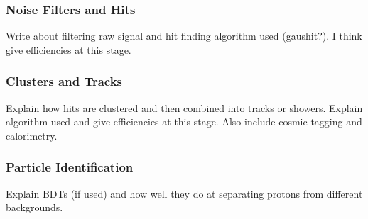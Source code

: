   \subsubsection{Noise Filters and Hits}
    Write about filtering raw signal and hit finding algorithm used (gaushit?).
    I think give efficiencies at this stage.
  \subsubsection{Clusters and Tracks}
    Explain how hits are clustered and then combined into tracks or showers.
    Explain algorithm used and give efficiencies at this stage. Also include
    cosmic tagging and calorimetry.
  \subsubsection{Particle Identification}
    Explain BDTs (if used) and how well they do at separating protons from
    different backgrounds.

